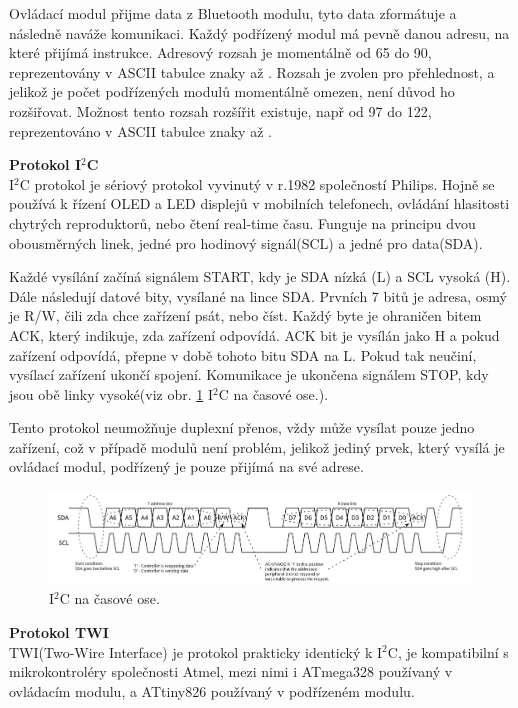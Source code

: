             
            Ovládací modul přijme data z Bluetooth modulu, tyto data zformátuje a následně naváže komunikaci. Každý podřízený modul má pevně danou adresu, na které přijímá instrukce. Adresový rozsah je momentálně od 65 do 90, reprezentovány v ASCII tabulce znaky  až . Rozsah je zvolen pro přehlednost, a jelikož je počet podřízených modulů momentálně omezen, není důvod ho rozšiřovat. Možnost tento rozsah rozšířit existuje, např od 97 do 122, reprezentováno v ASCII tabulce znaky  až .
            
            \textbf{Protokol I${^2}$C}\\
            I${^2}$C protokol je sériový protokol vyvinutý v r.1982 společností Philips. Hojně se používá k řízení OLED a LED displejů v mobilních telefonech, ovládání hlasitosti chytrých reproduktorů, nebo čtení real-time času. Funguje na principu dvou obousměrných linek, jedné pro hodinový signál(SCL) a jedné pro data(SDA).

            Každé vysílání začíná signálem START, kdy je SDA nízká (L) a SCL vysoká (H). Dále následují datové bity, vysílané na lince SDA. Prvních 7 bitů je adresa, osmý je R/W, čili zda chce zařízení psát, nebo číst. Každý byte je ohraničen bitem ACK, který indikuje, zda zařízení odpovídá. ACK bit je vysílán jako H a pokud zařízení odpovídá, přepne v době tohoto bitu SDA na L. Pokud tak neučiní, vysílací zařízení ukončí spojení. Komunikace je ukončena signálem STOP, kdy jsou obě linky vysoké(viz obr. \ref{fig:i2c} I${^2}$C na časové ose.).

            Tento protokol neumožňuje duplexní přenos, vždy může vysílat pouze jedno zařízení, což v případě modulů není problém, jelikož jediný prvek, který vysílá je ovládací modul, podřízený je pouze přijímá na své adrese\cite{i2c}.

            \begin{figure}[H]
                \includegraphics[width=\textwidth]{images/i2c_timing.png}
                \caption{I${^2}$C na časové ose\cite{i2c_graph}.}
                \label{fig:i2c}
            \end{figure}
            \textbf{Protokol TWI}\\
            TWI(Two-Wire Interface) je protokol prakticky identický k I${^2}$C, je kompatibilní s mikrokontroléry společnosti Atmel, mezi nimi i ATmega328 používaný v ovládacím modulu, a ATtiny826 používaný v podřízeném modulu\cite{TWI}.